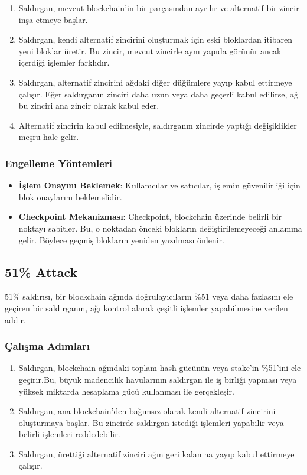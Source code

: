 \begin{enumerate}
    \item Saldırgan, mevcut blockchain’in bir parçasından ayrılır ve alternatif bir zincir inşa etmeye başlar.
    \item Saldırgan, kendi alternatif zincirini oluşturmak için eski bloklardan itibaren yeni bloklar üretir. Bu zincir, mevcut zincirle aynı yapıda görünür ancak içerdiği işlemler farklıdır.
    \item Saldırgan, alternatif zincirini ağdaki diğer düğümlere yayıp kabul ettirmeye çalışır. Eğer saldırganın zinciri daha uzun veya daha geçerli kabul edilirse, ağ bu zinciri ana zincir olarak kabul eder.
    \item Alternatif zincirin kabul edilmesiyle, saldırganın zincirde yaptığı değişiklikler meşru hale gelir.
\end{enumerate}

\subsubsection{Engelleme Yöntemleri}

\begin{itemize}
    \item \textbf{İşlem Onayını Beklemek}: Kullanıcılar ve satıcılar, işlemin güvenilirliği için blok onaylarını beklemelidir.
    \item \textbf{Checkpoint Mekanizması}: Checkpoint, blockchain üzerinde belirli bir noktayı sabitler. Bu, o noktadan önceki blokların değiştirilemeyeceği anlamına gelir. Böylece geçmiş blokların yeniden yazılması önlenir.
\end{itemize}

\newpage

\subsection{51\% Attack}

51\% saldırısı, bir blockchain ağında doğrulayıcıların \%51 veya daha fazlasını ele geçiren bir saldırganın, ağı kontrol alarak çeşitli işlemler yapabilmesine verilen addır. 

\subsubsection{Çalışma Adımları}

\begin{enumerate}
    \item Saldırgan, blockchain ağındaki toplam hash gücünün veya stake'in \%51'ini ele geçirir.Bu, büyük madencilik havularının saldırgan ile iş birliği yapması veya yüksek miktarda hesaplama gücü kullanması ile gerçekleşir.
    \item Saldırgan, ana blockchain’den bağımsız olarak kendi alternatif zincirini oluşturmaya başlar. Bu zincirde saldırgan istediği işlemleri yapabilir veya belirli işlemleri reddedebilir.
    \item Saldırgan, ürettiği alternatif zinciri ağın geri kalanına yayıp kabul ettirmeye çalışır.
\end{enumerate}

